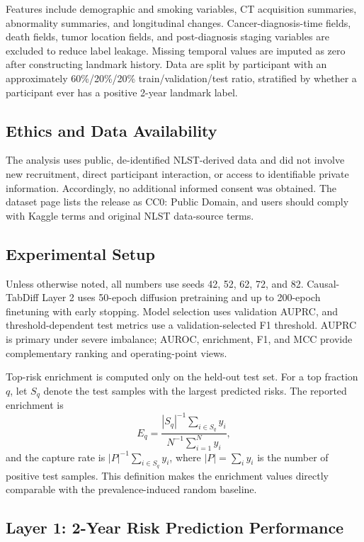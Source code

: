 \documentclass[11pt,journal,twoside]{IEEEtran}
\begin{document}
Features include demographic and smoking variables, CT acquisition summaries, abnormality summaries, and longitudinal changes. Cancer-diagnosis-time fields, death fields, tumor location fields, and post-diagnosis staging variables are excluded to reduce label leakage. Missing temporal values are imputed as zero after constructing landmark history. Data are split by participant with an approximately 60\%/20\%/20\% train/validation/test ratio, stratified by whether a participant ever has a positive 2-year landmark label.

\subsection{Ethics and Data Availability}

The analysis uses public, de-identified NLST-derived data and did not involve new recruitment, direct participant interaction, or access to identifiable private information. Accordingly, no additional informed consent was obtained. The dataset page lists the release as CC0: Public Domain, and users should comply with Kaggle terms and original NLST data-source terms.

\subsection{Experimental Setup}

Unless otherwise noted, all numbers use seeds 42, 52, 62, 72, and 82. Causal-TabDiff Layer 2 uses 50-epoch diffusion pretraining and up to 200-epoch finetuning with early stopping. Model selection uses validation AUPRC, and threshold-dependent test metrics use a validation-selected F1 threshold. AUPRC is primary under severe imbalance; AUROC, enrichment, F1, and MCC provide complementary ranking and operating-point views.

Top-risk enrichment is computed only on the held-out test set. For a top fraction $q$, let $S_q$ denote the test samples with the largest predicted risks. The reported enrichment is
\begin{equation}
E_q =
\frac{|S_q|^{-1}\sum_{i\in S_q} y_i}
{N^{-1}\sum_{i=1}^{N} y_i},
\label{eq:enrichment}
\end{equation}
and the capture rate is $|P|^{-1}\sum_{i\in S_q} y_i$, where $|P|=\sum_i y_i$ is the number of positive test samples. This definition makes the enrichment values directly comparable with the prevalence-induced random baseline.

\subsection{Layer 1: 2-Year Risk Prediction Performance}
\label{subsec:layer1_results}
\end{document}
